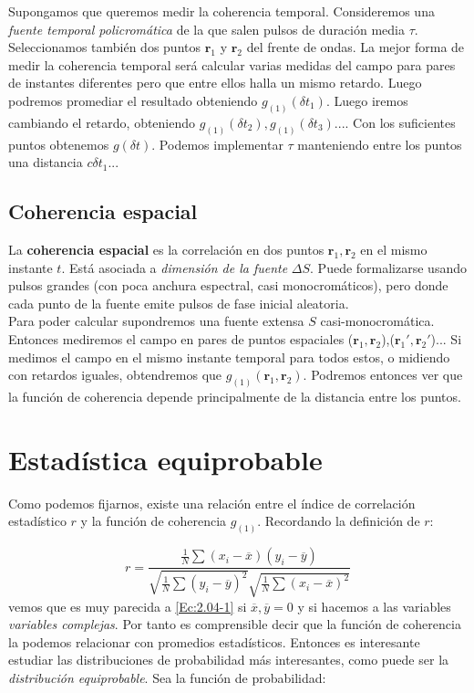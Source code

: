 \documentclass[12pt,a4paper]{book}
\numberwithin{equation}{section}
\numberwithin{figure}{section}
\newcommand{\1}{_{(1)}}
\newcommand{\2}{_{(2)}}
\newcommand{\rn}{\mathbf{r}}
\theoremstyle{definition}
\begin{document}
Supongamos que queremos medir la coherencia temporal. Consideremos una \textit{fuente temporal policromática} de la que salen pulsos de duración media $\tau$. Seleccionamos también dos puntos $\rn_1$ y $\rn_2$ del frente de ondas. La mejor forma de medir la coherencia temporal será calcular varias medidas del campo para pares de instantes diferentes pero que entre ellos halla un mismo retardo. Luego podremos promediar el resultado obteniendo $g_{(1)}(\delta t_1)$. Luego iremos cambiando el retardo, obteniendo $g_{(1)}(\delta t_2),g_{(1)}(\delta t_3)...$. Con los suficientes puntos obtenemos $g(\delta t)$. Podemos implementar $\tau$ manteniendo entre los puntos una distancia $c \delta t_1...$

\subsection{Coherencia espacial}

La \textbf{coherencia espacial} es la correlación en dos puntos $\rn_1,\rn_2$ en el mismo instante $t$. Está asociada a \textit{dimensión de la fuente} $\Delta S$. Puede formalizarse usando pulsos grandes (con poca anchura espectral, casi monocromáticos), pero donde cada punto de la fuente emite pulsos de fase inicial aleatoria.  \\

Para poder calcular supondremos una fuente extensa $S$ casi-monocromática. Entonces mediremos el campo en pares de puntos espaciales ($\rn_1,\rn_2$),($\rn_1',\rn_2'$)... Si medimos el campo en el mismo instante temporal para todos estos, o midiendo con retardos iguales, obtendremos que $g\1 (\rn_1,\rn_2)$. Podremos entonces ver que la función de coherencia depende principalmente de la distancia entre los puntos. 

\section{Estadística equiprobable}

Como podemos fijarnos, existe una relación entre el índice de correlación estadístico $r$ y la función de coherencia $g\1$. Recordando la definición de $r$:

\begin{equation}
r=\frac{\frac{1}{N}\sum (x_i - \overline{x})(y_i-\overline{y})}{\sqrt{ \frac{1}{N}\sum (y_i-\overline{y})^2} \sqrt{ \frac{1}{N}  \sum (x_i - \overline{x})^2}}
\end{equation}
vemos que es muy parecida a \ref{Ec:2.04-1} si $\overline{x},\overline{y}=0$ y si hacemos a las variables \textit{variables complejas}. Por tanto es comprensible decir que la función de coherencia la podemos relacionar con promedios estadísticos. Entonces es interesante estudiar las distribuciones de probabilidad más interesantes, como puede ser la \textit{distribución equiprobable}. Sea la función de probabilidad:
\end{document}
